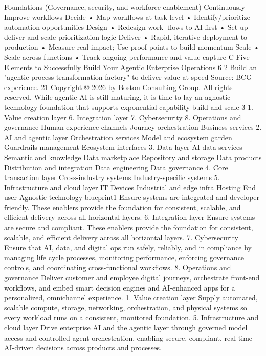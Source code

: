 Foundations (Governance, security, and workforce enablement)
Continuously
Improve workflows
Decide
• Map workflows at
task level
• Identify/prioritize
automation
opportunities
Design
• Redesign work-
flows to AI-first
• Set-up deliver
and scale
prioritization
logic
Deliver
• Rapid, iterative
deployment to
production
• Measure real impact;
Use proof points to
build momentum
Scale
• Scale across functions
• Track ongoing
performance and
value capture
C
Five Elements to Successfully Build Your Agentic Enterprise Operations
6
2
Build an "agentic process transformation factory" to deliver value at speed
Source: BCG experience.
21
Copyright © 2026 by Boston Consulting Group. All rights reserved.
While agentic AI is still maturing, it is time to lay an agnostic technology
foundation that supports exponential capability build and scale
3
1. Value creation layer
6. Integration layer
7. Cybersecurity
8. Operations and governance
Human experience channels
Journey orchestration
Business services
2. AI and agentic layer
Orchestration services
Model and ecosystem garden
Guardrails management
Ecosystem interfaces
3. Data layer
AI data services
Semantic and knowledge
Data marketplace
Repository and storage
Data products
Distribution and integration
Data engineering
Data governance
4. Core transaction layer
Cross-industry systems
Industry-specific systems
5. Infrastructure and cloud layer
IT
Devices
Industrial and
edge infra
Hosting
End user
Agnostic technology blueprint1
Ensure systems are integrated and developer friendly. These enablers provide the foundation for consistent,
scalable, and efficient delivery across all horizontal layers.
6. Integration layer
Ensure systems are secure and compliant. These enablers provide the foundation for consistent, scalable,
and efficient delivery across all horizontal layers.
7. Cybersecurity
Ensure that AI, data, and digital ops run safely, reliably, and in compliance by managing life cycle processes,
monitoring performance, enforcing governance controls, and coordinating cross-functional workflows.
8. Operations and governance
Deliver customer and employee digital journeys, orchestrate front-end workflows, and embed smart decision
engines and AI-enhanced apps for a personalized, omnichannel experience.
1. Value creation layer
Supply automated, scalable compute, storage, networking, orchestration, and physical systems so every
workload runs on a consistent, monitored foundation.
5. Infrastructure and cloud layer
Drive enterprise AI and the agentic layer through governed model access and controlled agent orchestration,
enabling secure, compliant, real-time AI-driven decisions across products and processes.
